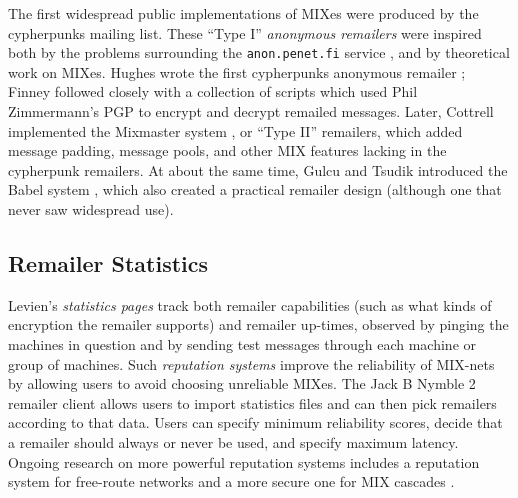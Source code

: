 \documentclass{llncs}
\begin{document}
The first widespread public implementations of MIXes were produced by the
cypherpunks mailing list. These ``Type I'' \emph{anonymous remailers}
were inspired both by the problems surrounding the {\tt anon.penet.fi}
service \cite{helsingius}, and by theoretical work on MIXes. Hughes wrote
the first cypherpunks anonymous remailer \cite{remailer-history}; Finney
followed closely with a collection of scripts which used Phil Zimmermann's
PGP to encrypt and decrypt remailed messages. Later, Cottrell implemented
the Mixmaster system \cite{mixmaster}, or ``Type II'' remailers, which
added message padding, message pools, and other MIX features lacking
in the cypherpunk remailers. At about the same time, Gulcu and Tsudik
introduced the Babel system \cite{babel}, which also created a practical
remailer design (although one that never saw widespread use).

\subsection{Remailer Statistics}

Levien's \emph{statistics pages} \cite{levien} track both remailer
capabilities (such as what kinds of encryption the remailer supports)
and remailer up-times, observed by pinging the machines in question
and by sending test messages through each machine or group of machines.
Such \emph{reputation systems} improve the reliability of MIX-nets by
allowing users to avoid choosing unreliable MIXes. The Jack B Nymble 2
remailer client \cite{potato} allows users to import statistics files
and can then pick remailers according to that data. Users can specify
minimum reliability scores, decide that a remailer should always or never
be used, and specify maximum latency. Ongoing research on more powerful
reputation systems includes a reputation system for free-route networks
\cite{mix-acc} and a more secure one for MIX cascades \cite{casc-rep}.





\end{document}
